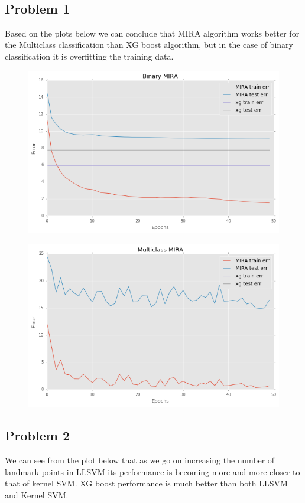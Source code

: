 \documentclass[12pt]{article}
\title{
	\vspace{2in}
	\textmd{\textbf{\hmwkClass}}\\ 
	\textmd{\textbf{\hmwkTitle}}\\
	\vspace{3in}
}
\author{\textbf{\hmwkAuthorName} \\ {\small \hmwkAuthorID}}
\date{} %
\begin{document}
	
\newpage
\subsection{Problem 1}	
	
Based on the plots below we can conclude that MIRA algorithm works better for the Multiclass classification than XG boost algorithm, but in the case of binary classification it is overfitting the training data.

\begin{figure}[h]
	\centering
	\includegraphics[width=12cm]{../Results/Binary_mira}
\end{figure}

\begin{figure}[h]
	\centering
	\includegraphics[width=12cm]{../Results/multi_class_MIRA}
\end{figure}

\newpage
\subsection{Problem 2}
We can see from the plot below that as we go on increasing the number of landmark points in LLSVM its performance is becoming more and more closer to that of kernel SVM. XG boost performance is much better than both LLSVM and Kernel SVM.
\end{document}

